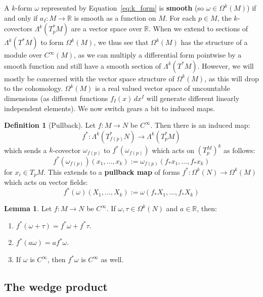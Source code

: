 \documentclass[11pt, oneside]{article}   	%
\theoremstyle{definition}
\newtheorem{definition}{Definition}[section]
\newtheorem{lemma}[theorem]{Lemma}
\begin{document}
A $k$-form $\omega$ represented by Equation~\ref{eq:k_form} is \textbf{smooth} (so $\omega\in\Omega^k(M)$) if and only if 
$a_I : M\rightarrow\mathbb R$ is smooth as a function on $M$. For each $p\in M$, the $k$-covectors $\Lambda^k(T_p^* M)$ 
are a vector space over $\mathbb R$. When we extend to sections of $\Lambda^k(T^* M)$ to form $\Omega^k(M)$, we 
thus see that $\Omega^k(M)$ has the structure of a module over $C^\infty(M)$, as we can multiply a differential 
form pointwise by a smooth function and still have a smooth section of $\Lambda^k(T^* M)$. However, we will mostly 
be concerned with the vector space structure of $\Omega^k(M)$, as this will drop to the cohomology. $\Omega^k(M)$ is a 
real valued vector space of uncountable dimensions (as different functions $f_I(x)\,dx^I$ will generate different linearly 
independent elements). We now switch gears a bit to induced maps.
\begin{definition}[Pullback]
	Let $f : M\rightarrow N$ be $C^\infty$. Then there is an induced map:
	\begin{equation}
		f^* : \Lambda^k\left(T_{f(p)}^* N\right)\rightarrow\Lambda^k\left(T_p^* M\right)
	\end{equation}
	which sends a $k$-covector $\omega_{f(p)}$ to $f^*(\omega_{f(p)})$ which acts on $\left(T_p^M\right)^k$ as follows:
	\begin{equation}
		f^*(\omega_{f(p)})(x_1, ..., x_k) := \omega_{f(p)}(f_* x_1, ..., f_* x_k)
	\end{equation}
	for $x_i\in T_p M$. This extends to a \textbf{pullback map} of forms $f^* : \Omega^k(N)\rightarrow\Omega^k(M)$ which 
	acts on vector fields:
	\begin{equation}
		f^*(\omega)(X_1, ..., X_k) := \omega(f_* X_1, ..., f_* X_k)
	\end{equation}
\end{definition}
\begin{lemma}
	Let $f : M\rightarrow N$ be $C^\infty$. If $\omega, \tau\in\Omega^k(N)$ and $a\in\mathbb R$, then:
	\begin{enumerate}
		\item $f^*(\omega + \tau) = f^*\omega + f^*\tau$. 
		\item $f^*(a\omega) = af^*\omega$. 
		\item If $\omega$ is $C^\infty$, then $f^*\omega$ is $C^\infty$ as well. 
	\end{enumerate}
\end{lemma}

\subsection{The wedge product}
\end{document}
